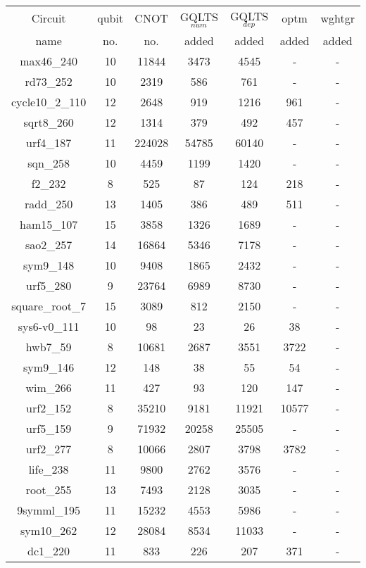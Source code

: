 \documentclass[runningheads]{llncs}
\begin{document}
		\begin{table}[H]
			\label{tab4}
			\begin{center}  
			\begin{tabular}{|c|c|c|c|c|c|c|}
			\hline
			Circuit &  qubit  & CNOT &GQLTS$_{num}$& GQLTS$_{dep}$  & optm 	 & wghtgr 	\\
			 name	&   no. 	&	no. & added&  added &  added 	&  added\\
			\hline
			max46\_240 & 10 & 11844 & 3473 & 4545 & - & - \\ 
rd73\_252 & 10 & 2319 & 586 & 761 & - & - \\ 
cycle10\_2\_110 & 12 & 2648 & 919 & 1216 & 961 & - \\ 
sqrt8\_260 & 12 & 1314 & 379 & 492 & 457 & - \\ 
urf4\_187 & 11 & 224028 & 54785 & 60140 & - & - \\ 
sqn\_258 & 10 & 4459 & 1199 & 1420 & - & - \\ 
f2\_232 & 8 & 525 & 87 & 124 & 218 & - \\ 
radd\_250 & 13 & 1405 & 386 & 489 & 511 & - \\ 
ham15\_107 & 15 & 3858 & 1326 & 1689 & - & - \\ 
sao2\_257 & 14 & 16864 & 5346 & 7178 & - & - \\ 
sym9\_148 & 10 & 9408 & 1865 & 2432 & - & - \\ 
urf5\_280 & 9 & 23764 & 6989 & 8730 & - & - \\ 
square\_root\_7 & 15 & 3089 & 812 & 2150 & - & - \\ 
sys6-v0\_111 & 10 & 98 & 23 & 26 & 38 & - \\ 
hwb7\_59 & 8 & 10681 & 2687 & 3551 & 3722 & - \\ 
sym9\_146 & 12 & 148 & 38 & 55 & 54 & - \\ 
wim\_266 & 11 & 427 & 93 & 120 & 147 & - \\ 
urf2\_152 & 8 & 35210 & 9181 & 11921 & 10577 & - \\ 
urf5\_159 & 9 & 71932 & 20258 & 25505 & - & - \\ 
urf2\_277 & 8 & 10066 & 2807 & 3798 & 3782 & - \\ 
life\_238 & 11 & 9800 & 2762 & 3576 & - & - \\ 
root\_255 & 13 & 7493 & 2128 & 3035 & - & - \\ 
9symml\_195 & 11 & 15232 & 4553 & 5986 & - & - \\ 
sym10\_262 & 12 & 28084 & 8534 & 11033 & - & - \\ 
dc1\_220 & 11 & 833 & 226 & 207 & 371 & - \\ 

\end{tabular}
\end{center}
\end{table}
\end{document}
